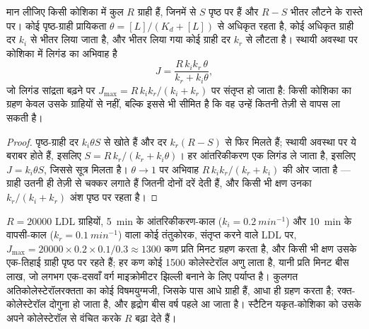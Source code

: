 \begin{proposition}[पुनर्चक्रित ग्राहियों से ग्रहण]\label{prop:b3:membrane-traffic:uptake}
मान लीजिए किसी कोशिका में कुल $R$ ग्राही हैं, जिनमें से $S$ पृष्ठ पर
हैं और $R - S$ भीतर लौटने के रास्ते पर। कोई पृष्ठ-ग्राही प्रायिकता
$\theta = [L]/(K_{d} + [L])$ से अधिकृत रहता है, कोई अधिकृत ग्राही दर
$k_{i}$ से भीतर लिया जाता है, और भीतर लिया गया कोई ग्राही दर
$k_{r}$ से लौटता है। स्थायी अवस्था पर कोशिका में लिगंड का अभिवाह है
\[
J = \frac{R\,k_{i}k_{r}\,\theta}{k_{r} + k_{i}\theta},
\]
जो लिगंड सांद्रता बढ़ने पर $J_{\max} =
R\,k_{i}k_{r}/(k_{i} + k_{r})$ पर संतृप्त हो जाता है: किसी कोशिका का
ग्रहण केवल उसके ग्राहियों से नहीं, बल्कि इससे भी सीमित है कि वह उन्हें
कितनी तेज़ी से वापस ला सकती है।
\end{proposition}
\begin{proof}
पृष्ठ-ग्राही दर $k_{i}\theta S$ से खोते हैं और दर
$k_{r}(R - S)$ से फिर मिलते हैं; स्थायी अवस्था पर ये बराबर होते हैं,
इसलिए $S = R\,k_{r}/(k_{r}
+ k_{i}\theta)$। हर आंतरिकीकरण एक लिगंड ले जाता है, इसलिए $J =
k_{i}\theta S$, जिससे सूत्र मिलता है। $\theta \to 1$ पर अभिवाह
$R\,k_{i}k_{r}/(k_{r} + k_{i})$ की ओर जाता है --- ग्राही उतनी ही तेज़ी
से चक्कर लगाते हैं जितनी दोनों दरें देती हैं, और किसी भी क्षण उनका
$k_{r}/(k_{i} + k_{r})$ अंश पृष्ठ पर रहता है।
\end{proof}

\begin{example}[कण-दर-कण LDL]\label{ex:b3:membrane-traffic:ldl}
$R = \num{20000}$ LDL ग्राहियों, \qty{5}{min} के आंतरिकीकरण-काल
($k_{i} = \qty{0.2}{min^{-1}}$) और \qty{10}{min} के वापसी-काल
($k_{r} = \qty{0.1}{min^{-1}}$) वाला कोई तंतुकोरक, संतृप्त करने वाले
LDL पर, $J_{\max} = \num{20000}\times 0.2\times 0.1/0.3 \approx 1300$
कण प्रति मिनट ग्रहण करता है, और किसी भी क्षण उसके एक-तिहाई ग्राही पृष्ठ
पर रहते हैं; हर कण कोई \num{1500} कोलेस्टेरॉल अणु लाता है, यानी प्रति
मिनट बीस लाख, जो लगभग एक-दसवाँ वर्ग माइक्रोमीटर झिल्ली बनाने के लिए
पर्याप्त है। कुलगत अतिकोलेस्टेरॉलरक्तता का कोई विषमयुग्मजी, जिसके पास
आधे ग्राही हैं, आधा ही ग्रहण करता है; रक्त-कोलेस्टेरॉल दोगुना हो जाता
है, और हृद्रोग बीस वर्ष पहले आ जाता है। स्टैटिन यकृत-कोशिका को उसके
अपने कोलेस्टेरॉल से वंचित करके $R$ बढ़ा देते हैं।
\end{example}


